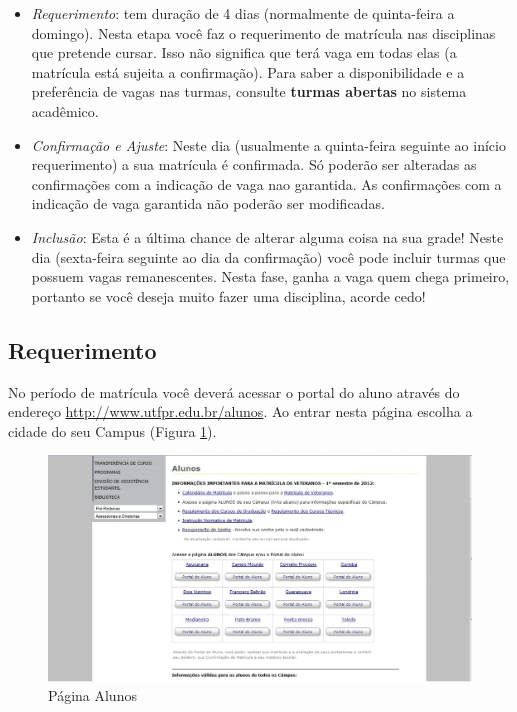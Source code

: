 \documentclass[a4paper,12pt,openany]{article}
\begin{document}
\begin{itemize}
\item \textit{Requerimento}: tem duração de 4 dias (normalmente de quinta-feira a domingo). Nesta etapa você faz o requerimento de matrícula nas disciplinas que pretende cursar. Isso não significa que terá vaga em todas elas (a matrícula está sujeita a confirmação). Para saber a disponibilidade e a preferência de vagas nas turmas, consulte \textbf{turmas abertas} no sistema acadêmico.

\item \textit {Confirmação e Ajuste}: Neste dia (usualmente a quinta-feira seguinte ao início requerimento) a sua matrícula é confirmada. Só poderão ser alteradas as confirmações com a indicação de vaga nao garantida. As confirmações com a indicação de vaga garantida não poderão ser modificadas.

\item \textit{Inclusão}: Esta é a última chance de alterar alguma coisa na sua grade! Neste dia (sexta-feira seguinte ao dia da confirmação) você pode incluir turmas que possuem vagas remanescentes. Nesta fase, ganha a vaga quem chega primeiro, portanto se você deseja muito fazer uma disciplina, acorde cedo!

\end{itemize}

\subsection{Requerimento}

No período de matrícula você deverá acessar o portal do aluno através do endereço \url{http://www.utfpr.edu.br/alunos}. Ao entrar nesta página escolha a cidade do seu Campus (Figura \ref{siteAluno}).

	\begin{figure}[ht!]  \centering
		\includegraphics[scale=0.4]{mat1.jpg}
		\caption{Página Alunos}
		\label{siteAluno}
	\end{figure}
\end{document}
